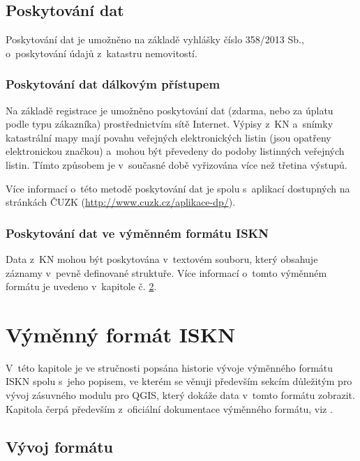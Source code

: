 \documentclass[a4paper,12pt,oneside]{book}
\begin{document}
\section{Poskytování dat}

Poskytování dat je umožněno na základě vyhlášky číslo 358/2013 Sb.,
o~poskytování údajů z~katastru nemovitostí.

\subsection{Poskytování dat dálkovým přístupem}

Na základě registrace je umožněno poskytování dat (zdarma, nebo za
úplatu podle typu zákazníka) prostřednictvím sítě Internet. Výpisy
z~KN a~snímky katastrální mapy mají povahu veřejných elektronických
listin (jsou opatřeny elektronickou značkou) a~mohou být převedeny do
podoby listinných veřejných listin. Tímto způsobem je v~současné době
vyřizována více než třetina výstupů. 

Více informací o~této metodě poskytování dat je spolu s~aplikací
dostupných na stránkách ČUZK (\url{http://www.cuzk.cz/aplikace-dp/}).

\subsection{Poskytování dat ve výměnném formátu ISKN}

Data z~KN mohou být poskytována v~textovém souboru, který obsahuje
záznamy v~pevně definované struktuře. Více informací o~tomto výměnném
formátu je uvedeno v~kapitole č. \ref{l_format_vfk}.


\clearpage
\chapter{Výměnný formát ISKN}
\label{l_format_vfk}

V~této kapitole je ve stručnosti popsána historie vývoje výměnného
formátu ISKN spolu s~jeho popisem, ve kterém se věnuji především
sekcím důležitým pro vývoj zásuvného modulu pro QGIS, který dokáže
data v~tomto formátu zobrazit. Kapitola čerpá především z~oficiální
dokumentace výměnného formátu, viz \cite{vfk_struktura}.


\section{Vývoj formátu}
\end{document}
